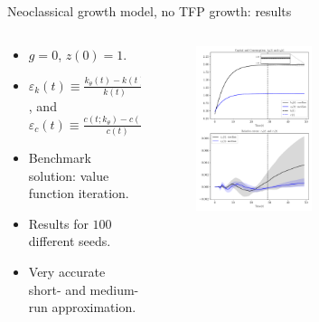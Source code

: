 \documentclass[aspectratio=169,10pt]{beamer}
\begin{document}
\begin{frame}{Neoclassical growth model, no TFP growth: results}
	\begin{columns}
		\begin{column}{0.5\textwidth}
			\begin{itemize}
				\item $g=0$, $z(0)=1$.
				\vspace{0.05in}
				\item $\varepsilon_k(t)\equiv \frac{k_\theta(t)-k(t)}{k(t)}$, and  $\varepsilon_c(t)\equiv \frac{c(t;k_\theta)-c(t)}{c(t)}$ 
				\vspace{0.05in}
				\item Benchmark solution: value function iteration.
				\vspace{0.05in}
				\item Results for $100$ different seeds.
				\vspace{0.05in}
				\item Very accurate short- and medium-run approximation.
			\end{itemize}
		\end{column}
		\begin{column}{0.65\textwidth}
			\begin{figure}[t!]
				\centering
				\includegraphics[width=0.5\textwidth]{figs/growth_sequential_g0.pdf}
				\hspace{25mm}
			\end{figure}
		\end{column}
	\end{columns}
\end{frame}
\end{document}
